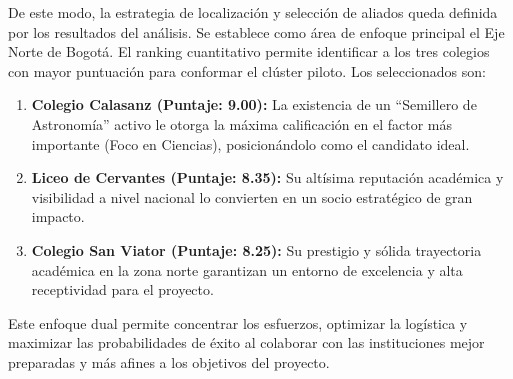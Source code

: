 \begin{table}[htbp!]
  \centering
  \caption{Matriz de Evaluación de Microlocalización (Selección de Colegios).}
  \label{tab:micro_colegios}
\end{table}

De este modo, la estrategia de localización y selección de aliados queda
definida por los resultados del análisis. Se establece como área de enfoque
principal el Eje Norte de Bogotá. El ranking cuantitativo permite identificar a
los tres colegios con mayor puntuación para conformar el clúster piloto. Los
seleccionados son:
\begin{enumerate}
  \item \textbf{Colegio Calasanz (Puntaje: 9.00):} La existencia de un
    ``Semillero de Astronomía'' activo le otorga la máxima calificación en el
    factor más importante (Foco en Ciencias), posicionándolo como el candidato
    ideal.
  \item \textbf{Liceo de Cervantes (Puntaje: 8.35):} Su altísima reputación
    académica y visibilidad a nivel nacional lo convierten en un socio
    estratégico de gran impacto.
  \item \textbf{Colegio San Viator (Puntaje: 8.25):} Su prestigio y sólida
    trayectoria académica en la zona norte garantizan un entorno de excelencia y
    alta receptividad para el proyecto.
\end{enumerate}
Este enfoque dual permite concentrar los esfuerzos, optimizar la logística y
maximizar las probabilidades de éxito al colaborar con las instituciones mejor
preparadas y más afines a los objetivos del proyecto.
